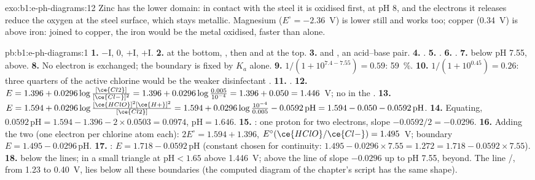 \begin{solution}{exo:b1:e-ph-diagrams:12}
Zinc has the lower domain: in contact with the steel it is oxidised
first,  at pH 8, and the electrons it
releases reduce the oxygen at the steel surface, which stays metallic.
Magnesium ($E^\circ = -2.36$~V) is lower still and works too; copper
(0.34~V) is above iron: joined to copper, the iron would be the metal
oxidised, faster than alone.
\end{solution}

\begin{solution}{pb:b1:e-ph-diagrams:1}
\textbf{1.} $-$I, 0, $+$I, $+$I.
\textbf{2.}  at the bottom, , then  and 
at the top.
\textbf{3.}  and , an acid--base pair.
\textbf{4.} .
\textbf{5.} .
\textbf{6.} .
\textbf{7.}  below pH 7.55,  above.
\textbf{8.} No electron is exchanged; the boundary is fixed by $K_a$ alone.
\textbf{9.} $1/(1 + 10^{7.4 - 7.55}) = 0.59$: \qty{59}{\percent}.
\textbf{10.} $1/(1 + 10^{0.45}) = 0.26$: three quarters of the active
chlorine would be the weaker disinfectant .
\textbf{11.} .
\textbf{12.} $E = 1.396 + 0.0296\log\frac{[\ce{Cl2}]}{[\ce{Cl-}]^2} = 1.396
+ 0.0296\log\frac{0.005}{10^{-4}} = 1.396 + 0.050 = 1.446$~V; no 
in the .
\textbf{13.} $E = 1.594 + 0.0296\log\frac{[\ce{HClO}]^2[\ce{H+}]^2}{[\ce{Cl2}]}
= 1.594 + 0.0296\log\frac{10^{-4}}{0.005} - 0.0592\,\mathrm{pH} = 1.594 -
0.050 - 0.0592\,\mathrm{pH}$.
\textbf{14.} Equating, $0.0592\,\mathrm{pH} = 1.594 - 1.396 - 2 \times 0.0503
= 0.0974$, $\mathrm{pH} = 1.646$.
\textbf{15.} : one proton for two
electrons, slope $-0.0592/2 = -0.0296$.
\textbf{16.} Adding the two  (one electron per chlorine
atom each): $2E^\circ = 1.594 + 1.396$, $E^\circ(\ce{HClO}/\ce{Cl-}) =
1.495$~V; boundary $E = 1.495 - 0.0296\,\mathrm{pH}$.
\textbf{17.} : $E = 1.718 - 0.0592\,\mathrm{pH}$
(constant chosen for continuity: $1.495 - 0.0296 \times 7.55 = 1.272 = 1.718
- 0.0592 \times 7.55$).
\textbf{18.}  below the lines;  in a small triangle at
$\mathrm{pH} < 1.65$ above 1.446~V;  above the line of slope
$-0.0296$ up to pH 7.55,  beyond. The line /,
from 1.23 to 0.40~V, lies below all these boundaries (the computed
diagram of the chapter's script has the same shape).

\end{solution}
